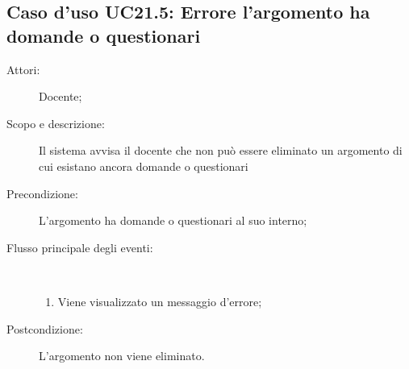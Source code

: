 \subsection{Caso d'uso UC21.5: Errore l'argomento ha domande o questionari}\begin{description}
\item[Attori:] Docente;
\item[Scopo e descrizione:] Il sistema avvisa il docente che non può essere eliminato un argomento di cui esistano ancora domande o questionari
      \item[Precondizione:] L'argomento ha domande o questionari al suo interno;

        \item[Flusso principale degli eventi:] \ 
 \begin{enumerate}
          \item Viene visualizzato un messaggio d'errore;

      \end{enumerate}
    \item[Postcondizione:] L'argomento non viene eliminato.
  \end{description}
\hypertarget{UC22}{}
